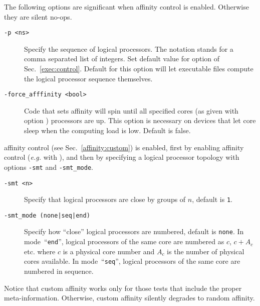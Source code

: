The following options are significant when affinity control is enabled.
Otherwise they are silent no-ops.
\begin{description}
\item[{\tt -p <ns>}]
Specify the sequence of logical processors.
The notation  stands for a comma separated list of integers.
Set default value for option  of Sec.~\ref{exec:control}.
Default for this  option
will let executable files compute the logical processor sequence
themselves.
\item[{\tt -force\_afffinity <bool>}]
Code that sets affinity will spin until all specified
cores (as given with option ) processors
are up. This option is necessary on devices that let core sleep
when the computing load is low. Default is false.
\end{description}

 affinity control (see Sec.~\ref{affinity:custom}) is enabled,
first by enabling affinity control (\emph{e.g.} with ),
and then by specifying a logical processor topology with options \texttt{-smt}
and \texttt{-smt\_mode}.
\begin{description}
\item[{\tt -smt <n>}] Specify that logical processors are close by groups
of $n$, default is \texttt{1}.
\item[{\tt -smt\_mode (none|seq|end)}] Specify how ``close'' logical processors
are numbered, default is \texttt{none}.
In mode~``\texttt{end}'', logical processors of the same core
are numbered as $c$, $c+A_c$ etc. where $c$ is a physical core number and
$A_c$ is the number of physical cores available.
In mode~``\texttt{seq}'', logical processors of the same core
are numbered in sequence.
\end{description}
Notice that custom affinity works only for those tests that include the proper
meta-information. Otherwise, custom affinity silently degrades
to random affinity.

